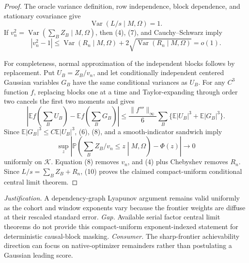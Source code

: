 \documentclass{article}
\begin{document}
\begin{proof}
The oracle variance definition, row independence, block dependence, and stationary covariance give
\[
 \operatorname{Var}(L/s\mid M,\Omega)=1.
 \tag{7}
\]
If \(v_n^2=\operatorname{Var}(\sum_BZ_B\mid M,\Omega)\), then (4), (7), and Cauchy--Schwarz imply
\[
 |v_n^2-1|
 \le\operatorname{Var}(R_n\mid M,\Omega)
 +2\sqrt{\operatorname{Var}(R_n\mid M,\Omega)}=o(1).
 \tag{8}
\]

For completeness, normal approximation of the independent blocks follows by replacement.  Put \(U_B=Z_B/v_n\), and let conditionally independent centered Gaussian variables \(G_B\) have the same conditional variances as \(U_B\).  For any \(C^3\) function \(f\), replacing blocks one at a time and Taylor-expanding through order two cancels the first two moments and gives
\[
 \left|\mathbb Ef\!\left(\sum_BU_B\right)
 -\mathbb Ef\!\left(\sum_BG_B\right)\right|
 \le\frac{\|f'''\|_\infty}{6}
 \sum_B\{\mathbb E|U_B|^3+\mathbb E|G_B|^3\}.
 \tag{9}
\]
Since \(\mathbb E|G_B|^3\le C\mathbb E|U_B|^3\), (6), (8), and a smooth-indicator sandwich imply
\[
 \sup_z\left|\mathbb P\!\left(\sum_BZ_B/v_n\le z\middle|M,\Omega\right)-\Phi(z)\right|\to0
 \tag{10}
\]
uniformly on \(\mathcal K\).  Equation (8) removes \(v_n\), and (4) plus Chebyshev removes \(R_n\).  Since \(L/s=\sum_BZ_B+R_n\), (10) proves the claimed compact-uniform conditional central limit theorem.
\end{proof}
\par\smallskip\noindent \textit{Justification.} A dependency-graph Lyapunov argument remains valid uniformly as the cohort and window exponents vary because the frontier weights are diffuse at their rescaled standard error. \textit{Gap.} Available serial factor central limit theorems do not provide this compact-uniform exponent-indexed statement for deterministic causal-block masking. \textit{Consumer.} The sharp-frontier achievability direction can focus on native-optimizer remainders rather than postulating a Gaussian leading score.
\end{document}
